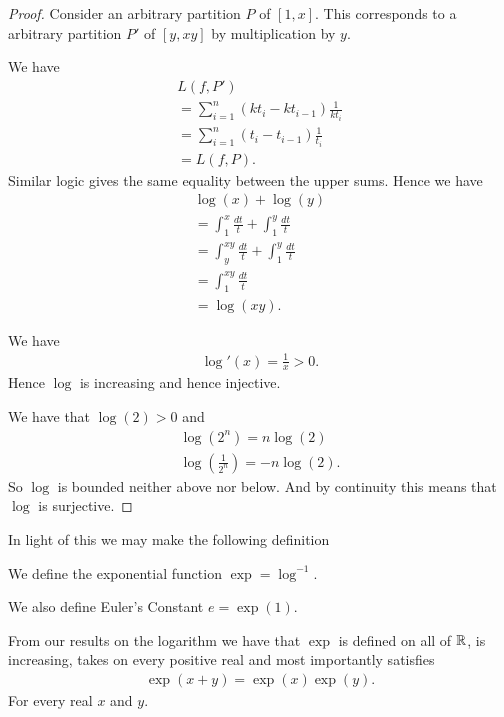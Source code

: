 \documentclass[]{article}
\begin{document}
\begin{proof}
		Consider an arbitrary partition $P$ of $[1,x]$. This corresponds to a arbitrary partition $P'$ of $[y,xy]$ by multiplication by $y$.

		We have
		\begin{align*}
				L(f,P') \\
				= \sum_{i=1}^n (kt_i - kt_{i-1}) \frac{1}{kt_i} \\
				= \sum_{i=1}^n (t_i-t_{i-1})\frac{1}{t_i} \\
				= L(f,P).
		\end{align*}
		Similar logic gives the same equality between the upper sums. Hence we have
		\begin{align*}
				\log(x) + \log(y) \\
				= \int_1^x \frac{dt}{t} + \int_1^y \frac{dt}{t}  \\
				= \int_y^{xy}  \frac{dt}{t} + \int_1^y  \frac{dt}{t} \\
						= \int_1^{xy}  \frac{dt}{t} \\
						= \log(xy).
		\end{align*}

		We have 
		\begin{align*}
				\log'(x) = \frac{1}{x} > 0.
		\end{align*}
		Hence $\log$ is increasing and hence injective.

		We have that  $\log(2) > 0$ and 
		\begin{align*}
				\log(2^n) = n\log(2) \\
				\log(\frac{1}{2^n}) = -n\log(2).
		\end{align*}
		So $\log$ is bounded neither above nor below. And by continuity this means that $\log$ is surjective.
\end{proof}

In light of this we may make the following definition

\begin{defi} [Exponential]
	We define the exponential function $\exp = \log^{-1}$.	

	We also define Euler's Constant $e = \exp(1)$.
\end{defi}

From our results on the logarithm we have that $\exp$ is defined on all of $\mathbb{R}$, is increasing, takes on every positive real and most importantly satisfies
\begin{align*}
	\exp(x+y) = \exp(x) \exp(y).		
\end{align*}
For every real $x$ and $y$.
\end{document}
